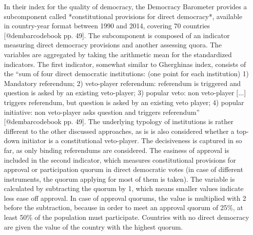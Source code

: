 \documentclass{systats}
\begin{document}
In their index for the quality of democracy, the Democracy Barometer provides a subcomponent called *constitutional provisions for direct democracy*, available in country-year format between 1990 and 2014, covering 70 countries [@dembarcodebook pp. 49]. The subcomponent is composed of an indicator measuring direct democracy provisions and another assessing quora. The variables are aggregated by taking the arithmetic mean for the standardized indicators. The first indicator, somewhat similar to Gherghinas index, consists of the “sum of four direct democratic institutions: (one point for each institution) 1) Mandatory referendum; 2) veto-player referendum: referendum is triggered and question is asked by an existing veto-player; 3) popular veto: non veto-player [...] triggers referendum, but question is asked by an existing veto player; 4) popular initiative: non veto-player asks question and triggers referendum” [@dembarcodebook pp. 49]. The underlying typology of institutions is rather different to the other discussed approaches, as is is also considered whether a top-down initiator is a constitutional veto-player. The decisiveness is captured in so far, as only binding referendums are considered. The easiness of approval is included in the second indicator, which measures constitutional provisions for approval or participation quorum in direct democratic votes (in case of different instruments, the quorum applying for most of them  is taken). The variable is calculated by subtracting the quorum by 1, which means smaller values indicate less ease off approval. In case of approval quorums, the value is multiplied with 2 before the subtraction, because in order to meet an approval quorum of 25\%, at least 50\% of the population must participate. Countries with no direct democracy are given the value of the country with the highest quorum. 
\end{document}
